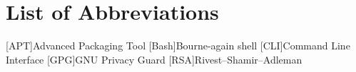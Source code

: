 \chapter*{List of Abbreviations} 

\begin{acronym}
	
	[APT]{Advanced Packaging Tool}
	[Bash]{Bourne-again shell}
	[CLI]{Command Line Interface}
	[GPG]{GNU Privacy Guard}
	[RSA]{Rivest–Shamir–Adleman}
	
	
\end{acronym}